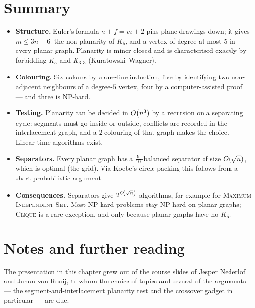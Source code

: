 \section{Summary}

\begin{itemize}
  \item \textbf{Structure.} Euler's formula $n + f = m + 2$ pins plane drawings
        down; it gives $m \le 3n-6$, the non-planarity of $K_5$, and a vertex
        of degree at most $5$ in every planar graph. Planarity is minor-closed
        and is characterised exactly by forbidding $K_5$ and $K_{3,3}$
        (Kuratowski--Wagner).
  \item \textbf{Colouring.} Six colours by a one-line induction, five by
        identifying two non-adjacent neighbours of a degree-$5$ vertex, four by
        a computer-assisted proof --- and three is NP-hard.
  \item \textbf{Testing.} Planarity can be decided in $O\!\left(n^3\right)$ by a
        recursion on a separating cycle: segments must go inside or outside,
        conflicts are recorded in the interlacement graph, and a $2$-colouring
        of that graph makes the choice. Linear-time algorithms exist.
  \item \textbf{Separators.} Every planar graph has a $\tfrac{9}{10}$-balanced
        separator of size $O\!\left(\sqrt n\right)$, which is optimal (the grid). Via
        Koebe's circle packing this follows from a short probabilistic
        argument.
  \item \textbf{Consequences.} Separators give $2^{O\!\left(\sqrt n\right)}$ algorithms,
        for example for \textsc{Maximum Independent Set}. Most NP-hard problems
        stay NP-hard on planar graphs; \textsc{Clique} is a rare exception, and
        only because planar graphs have no $K_5$.
\end{itemize}

\section{Notes and further reading}
\label{sec:planar-further-reading}

The presentation in this chapter grew out of the course slides of Jesper
Nederlof and Johan van Rooij, to whom the choice of topics and several of the
arguments --- the segment-and-interlacement planarity test and the crossover
gadget in particular --- are due.

